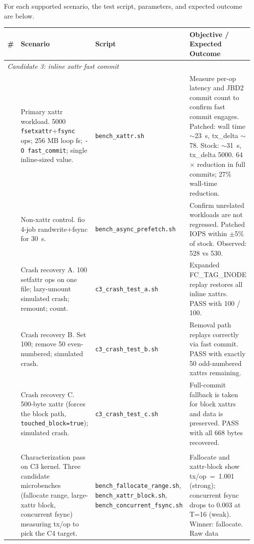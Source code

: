 \documentclass[11pt,a4paper]{article}
\begin{document}
For each supported scenario, the test script, parameters, and
expected outcome are below.

\begin{center}
\small
\begin{tabularx}{\textwidth}{lXXX}
\toprule
\# & Scenario & Script & Objective / Expected Outcome \\
\midrule
\multicolumn{4}{l}{\textit{Candidate 3: inline xattr fast commit}} \\
\addlinespace
1 & Primary xattr workload. 5000
  \texttt{fsetxattr}+\texttt{fsync} ops; 256 MB loop fs;
  \texttt{-O fast\_commit}; single inline-sized value. &
  \texttt{bench\_xattr.sh} &
  Measure per-op latency and JBD2 commit count to confirm fast
  commit engages. Patched: wall time $\sim$23~s, tx\_delta
  $\sim$78. Stock: $\sim$31~s, tx\_delta 5000. 64$\times$ reduction
  in full commits; 27\% wall-time reduction. \\
\addlinespace
2 & Non-xattr control. fio 4-job randwrite+fsync for 30~s. &
  \texttt{bench\_async\_prefetch.sh} &
  Confirm unrelated workloads are not regressed. Patched IOPS
  within $\pm$5\% of stock. Observed: 528 vs 530. \\
\addlinespace
3 & Crash recovery A. 100 setfattr ops on one file; lazy-umount
  simulated crash; remount; count. &
  \texttt{c3\_crash\_test\_a.sh} &
  Expanded FC\_TAG\_INODE replay restores all inline xattrs. PASS
  with 100 / 100. \\
\addlinespace
4 & Crash recovery B. Set 100; remove 50 even-numbered;
  simulated crash. &
  \texttt{c3\_crash\_test\_b.sh} &
  Removal path replays correctly via fast commit. PASS with
  exactly 50 odd-numbered xattrs remaining. \\
\addlinespace
5 & Crash recovery C. 500-byte xattr (forces the block path,
  \texttt{touched\_block=true}); simulated crash. &
  \texttt{c3\_crash\_test\_c.sh} &
  Full-commit fallback is taken for block xattrs and data is
  preserved. PASS with all 668 bytes recovered. \\
\addlinespace
\multicolumn{4}{l}{\textit{Candidate 4: fallocate range fast commit}} \\
\addlinespace
6 & Characterization pass on C3 kernel. Three candidate microbenches
  (fallocate range, large-xattr block, concurrent fsync)
  measuring tx/op to pick the C4 target. &
  \texttt{bench\_fallocate\_range.sh}, \texttt{bench\_xattr\_block.sh},
  \texttt{bench\_concurrent\_fsync.sh} &
  Fallocate and xattr-block show tx/op~=~1.001 (strong); concurrent
  fsync drops to 0.003 at T=16 (weak). Winner: fallocate. Raw data

\end{tabularx}
\end{center}
\end{document}
